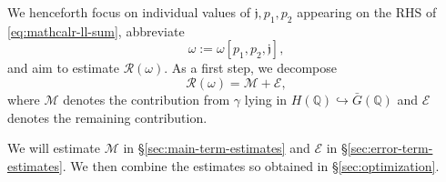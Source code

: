 \documentclass[reqno]{amsart}
\theoremstyle{plain} \newtheorem{theorem} {Theorem}
\theoremstyle{definition} \newtheorem{definition} [theorem] {Definition}
\theoremstyle{itplain} %
\numberwithin{equation}{section}
\numberwithin{theorem}{section}
\begin{document}
We henceforth focus on individual values of $\mathfrak{j}, p_1, p_2$ appearing on the RHS of \eqref{eq:mathcalr-ll-sum}, abbreviate
\begin{equation*}
\omega := \omega[p_1,p_2,\mathfrak{j}],
\end{equation*}
and aim to estimate $\mathcal{R}(\omega)$.  As a first step, we decompose
\begin{equation}\label{eq:mathc-=-mathc}
\mathcal{R}(\omega) = \mathcal{M} + \mathcal{E},
\end{equation}
where $\mathcal{M}$ denotes the contribution from $\gamma$ lying in $H(\mathbb{Q}) \hookrightarrow \bar{G}(\mathbb{Q})$ and $\mathcal{E}$ denotes the remaining contribution.

We will estimate $\mathcal{M}$ in \S\ref{sec:main-term-estimates} and $\mathcal{E}$ in \S\ref{sec:error-term-estimates}.  We then combine the estimates so obtained in \S\ref{sec:optimization}.
\end{document}
